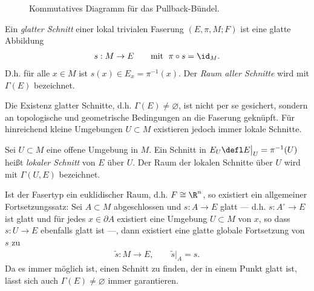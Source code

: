 \documentclass[%
	paper=a5,%
	fleqn,%
	DIV=18,%
	BCOR=0mm,
	fontsize=11pt,
	titlepage=false,%
	bibliography=totoc,
	DIV=18,%
	twoside=true,
	pdftitle=Riemannsche Geometrie,
	pdfauthor=Uwe Semmelmann,
	numbers=noendperiod]%
	{scrbook}
\begin{document}
\begin{figure}[ht]
\centering
{}
\caption{Kommutatives Diagramm für das Pullback-Bündel.}
\end{figure}


\begin{defn}
Ein \emph{glatter Schnitt} einer lokal trivialen Faserung $(E,\pi,M;F)$ ist eine
glatte Abbildung
\begin{align*}
s: M\to E    \qquad \text{mit }   \;  \pi\circ s = \id_M.
\end{align*}
D.h. für alle $x\in M$ ist $s(x)\in E_x = \pi^{-1}(x)$. Der \emph{Raum aller
Schnitte} wird mit $\Gamma(E)$ bezeichnet.
\fish
\end{defn}

Die Existenz glatter Schnitte, d.h. $\Gamma(E)\neq \varnothing$, ist nicht per
se gesichert, sondern an topologische und geometrische Bedingungen an die
Faserung geknüpft. Für hinreichend kleine Umgebungen $U\subset M$ existieren
jedoch immer lokale Schnitte.

\begin{defn}
Sei $U\subset M$ eine offene Umgebung in $M$. Ein Schnitt in $E_U \defl
E\big|_U= \pi^{-1}(U)$ heißt \emph{lokaler Schnitt} von
$E$ über $U$. Der Raum der lokalen Schnitte über $U$ wird mit $\Gamma(U,E)$
bezeichnet.\fish
\end{defn}

\begin{rem}
Ist der Fasertyp ein euklidischer Raum, d.h. $F\cong \R^n$, so existiert ein
allgemeiner Fortsetzungssatz: Sei $A\subset M$ abgeschlossen und $s\colon A\to E$
glatt --- d.h. $s\colon A^\circ \to E$ ist glatt und für jedes $x\in\partial A$
existiert eine Umgebung $U\subset M$ von $x$, so dass $s\colon U\to E$ ebenfalls
glatt ist ---, dann existiert eine glatte globale Fortsetzung von $s$ zu
\begin{align*}
\tilde{s}\colon M\to E,\qquad \tilde{s}\big|_A = s.
\end{align*}
Da es immer möglich ist, einen Schnitt zu finden, der in einem Punkt glatt ist, lässt
sich auch $\Gamma(E)\neq\varnothing$ immer garantieren.\map
\end{rem}
\end{document}

